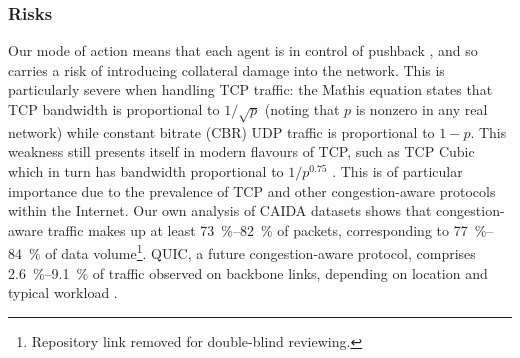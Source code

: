 \documentclass[10pt, times, conference, letterpaper]{IEEEtran}
\begin{document}
\subsubsection{Risks}
Our mode of action means that each agent is in control of pushback \cite{DBLP:journals/ccr/MahajanBFIPS02a}, and so carries a risk of introducing collateral damage into the network.
This is particularly severe when handling TCP traffic: the Mathis equation \cite{DBLP:journals/ccr/MathisSMO97} states that TCP bandwidth is proportional to $1/\sqrt{p}$ (noting that $p$ is nonzero in any real network) while constant bitrate (CBR) UDP traffic is proportional to $1 - p$.
This weakness still presents itself in modern flavours of TCP, such as TCP Cubic which in turn has bandwidth proportional to $1/p^{0.75}$ \cite{rfc8312}.
This is of particular importance due to the prevalence of TCP and other congestion-aware protocols within the Internet.
Our own analysis of CAIDA datasets \cite{caida-2018-passive} shows that congestion-aware traffic makes up at least \SIrange{73}{82}{\percent} of packets, corresponding to \SIrange{77}{84}{\percent} of data volume\footnote{Repository link removed for double-blind reviewing.}.
QUIC, a future congestion-aware protocol, comprises \SIrange{2.6}{9.1}{\percent} of traffic observed on backbone links, depending on location and typical workload \cite{DBLP:conf/pam/RuthPDH18}.
\end{document}
